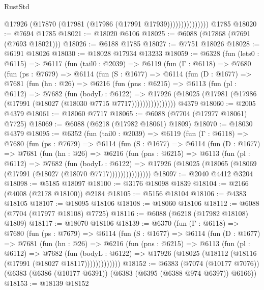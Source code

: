 \begin{lexlean}{RustStd}
\begin{coremodule}
                        @17926 (@17870 (@17981 (@17986 (@17991 @17939)))))))))))))))
    @1785
@18020 := @7694 @1785
@18021 := @18020 @6106
@18025 := @6088 (@17868 (@7691 (@7693 @18021)))
@18026 := @6188 @1785
@18027 := @7751 @18026
@18028 := @6191 @18026
@18030 := @18028 @17934 @13233
@18059 := @6328
    (fun (lets0 : @6115) =>
    @6117
      (fun (tail0 : @2039) =>
      @6119
        (fun (Γ : @6118) =>
        @7680
          (fun (ps : @7679) =>
          @6114
            (fun (S : @1677) =>
            @6114
              (fun (D : @1677) =>
              @7681
                (fun (hn : @26) =>
                @6216
                  (fun (pns : @6215) =>
                  @6113
                    (fun (pl : @6112) =>
                    @7682
                      (fun (bodyL : @6122) =>
                      @17926
                        (@18025 (@17981 (@17986 (@17991 (@18027 (@18030 @7715 @7717))))))))))))))))
    @4379
@18060 := @2005 @4379
@18061 := @18060 @7717
@18065 := @6088 (@7704 (@17977 @18061) @7725)
@18069 := @6088 (@6218 (@17982 @18061) @1809)
@18070 := @18030 @4379
@18095 := @6352
    (fun (tail0 : @2039) =>
    @6119
      (fun (Γ : @6118) =>
      @7680
        (fun (ps : @7679) =>
        @6114
          (fun (S : @1677) =>
          @6114
            (fun (D : @1677) =>
            @7681
              (fun (hn : @26) =>
              @6216
                (fun (pns : @6215) =>
                @6113
                  (fun (pl : @6112) =>
                  @7682
                    (fun (bodyL : @6122) =>
                    @17926 (@18025 (@18065 (@18069 (@17991 (@18027 (@18070 @7717)))))))))))))))
@18097 := @2040 @4412 @3204
@18098 := @5185 @18097
@18100 := @3176 @18098 @1839
@18104 := @2166 (@4008 (@2178 @18100)) @2184
@18105 := @5156 @18104
@18106 := @4383 @18105
@18107 := @18095 @18106
@18108 := @18060 @18106
@18112 := @6088 (@7704 (@17977 @18108) @7725)
@18116 := @6088 (@6218 (@17982 @18108) @1809)
@18117 := @18070 @18106
@18139 := @6370
    (fun (Γ : @6118) =>
    @7680
      (fun (ps : @7679) =>
      @6114
        (fun (S : @1677) =>
        @6114
          (fun (D : @1677) =>
          @7681
            (fun (hn : @26) =>
            @6216
              (fun (pns : @6215) =>
              @6113
                (fun (pl : @6112) =>
                @7682
                  (fun (bodyL : @6122) =>
                  @17926 (@18025 (@18112 (@18116 (@17991 (@18027 @18117)))))))))))))
@18152 := @6383
    (@7074 (@10177 @7076))
    (@6383 (@6386 (@10177 @6391)) (@6383 (@6395 (@6388 @974 @6397)) @6166))
@18153 := @18139 @18152

\end{coremodule}
\end{lexlean}
